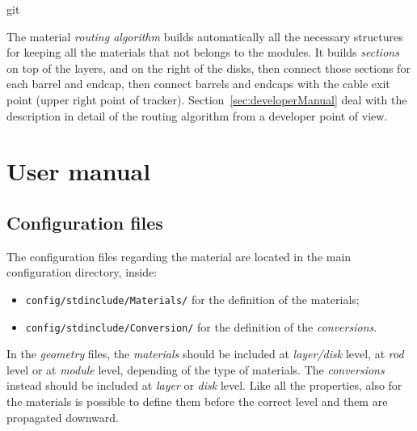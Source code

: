 git\documentclass[12pt, a4paper]{article}
\newcommand{\pat}[1]{\texttt{#1}}
\begin{document}
The material \emph{routing algorithm} builds automatically all the necessary structures for
keeping all the materials that not belongs to the modules. It builds
\emph{sections} on top of the layers, and on the right of the disks,
then connect those sections for each barrel and endcap, then connect
barrels and endcaps with the cable exit point (upper right point of
tracker). Section~\ref{sec:developerManual} deal with the description
in detail of the routing algorithm from a developer point of view.

\section{User manual}\label{sec:userManual}
\subsection{Configuration files}
The configuration files regarding the material are located in the main
configuration directory, inside:
\begin{itemize}
\item \pat{config/stdinclude/Materials/} for the definition of the
  materials;
\item \pat{config/stdinclude/Conversion/} for the definition of the
  \emph{conversions}.
\end{itemize}

In the \emph{geometry} files, the \emph{materials} should be included
at \emph{layer/disk} level, at \emph{rod} level or at \emph{module}
level, depending of the type of materials. The \emph{conversions}
instead should be included at \emph{layer} or \emph{disk} level. Like
all the properties, also for the materials is possible to define them before
the correct level and them are propagated downward.
\end{document}
